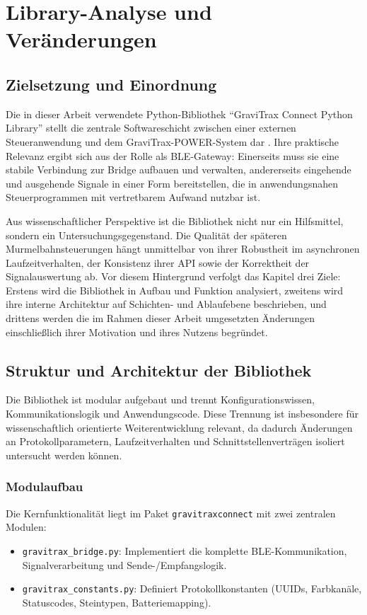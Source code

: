 \chapter{Library-Analyse und Veränderungen}

\section{Zielsetzung und Einordnung}
Die in dieser Arbeit verwendete Python-Bibliothek \enquote{GraviTrax Connect Python Library} stellt die zentrale Softwareschicht zwischen einer externen Steueranwendung und dem GraviTrax-POWER-System dar \cite{github2023gravitraxconnectlibrary}.
Ihre praktische Relevanz ergibt sich aus der Rolle als BLE-Gateway: Einerseits muss sie eine stabile Verbindung zur Bridge aufbauen und verwalten, andererseits eingehende und ausgehende Signale in einer Form bereitstellen, die in anwendungsnahen Steuerprogrammen mit vertretbarem Aufwand nutzbar ist.

Aus wissenschaftlicher Perspektive ist die Bibliothek nicht nur ein Hilfsmittel, sondern ein Untersuchungsgegenstand.
Die Qualität der späteren Murmelbahnsteuerungen hängt unmittelbar von ihrer Robustheit im asynchronen Laufzeitverhalten, der Konsistenz ihrer API sowie der Korrektheit der Signalauswertung ab.
Vor diesem Hintergrund verfolgt das Kapitel drei Ziele: Erstens wird die Bibliothek in Aufbau und Funktion analysiert, zweitens wird ihre interne Architektur auf Schichten- und Ablaufebene beschrieben, und drittens werden die im Rahmen dieser Arbeit umgesetzten Änderungen einschließlich ihrer Motivation und ihres Nutzens begründet.

\section{Struktur und Architektur der Bibliothek}
Die Bibliothek ist modular aufgebaut und trennt Konfigurationswissen, Kommunikationslogik und Anwendungscode.
Diese Trennung ist insbesondere für wissenschaftlich orientierte Weiterentwicklung relevant, da dadurch Änderungen an Protokollparametern, Laufzeitverhalten und Schnittstellenverträgen isoliert untersucht werden können.

\subsection{Modulaufbau}
Die Kernfunktionalität liegt im Paket \texttt{gravitraxconnect} mit zwei zentralen Modulen:
\begin{itemize}
	\item \texttt{gravitrax\_bridge.py}: Implementiert die komplette BLE-Kommunikation, Signalverarbeitung und Sende-/Empfangslogik.
	\item \texttt{gravitrax\_constants.py}: Definiert Protokollkonstanten (UUIDs, Farbkanäle, Statuscodes, Steintypen, Batteriemapping).
\end{itemize}

